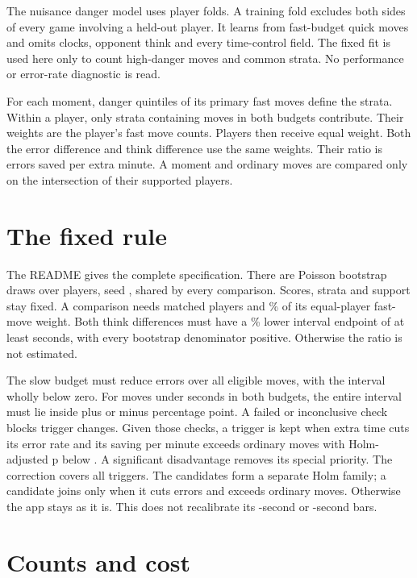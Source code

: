 \documentclass[11pt]{article}
\begin{document}
The nuisance danger model uses \FoldCount{} player folds. A training fold
excludes both sides of every game involving a held-out player. It learns
from fast-budget quick moves and omits clocks, opponent think and every
time-control field. The fixed fit is used here only to count high-danger
moves and common strata. No performance or error-rate diagnostic is read.

For each moment, danger quintiles of its primary fast moves define the
strata. Within a player, only strata containing moves in both budgets
contribute. Their weights are the player's fast move counts. Players then
receive equal weight. Both the error difference and think difference use
the same weights. Their ratio is errors saved per extra minute. A moment
and ordinary moves are compared only on the intersection of their
supported players.

\section{The fixed rule}
The README gives the complete specification. There are \Draws{} Poisson
bootstrap draws over players, seed \Seed, shared by every comparison.
Scores, strata and support stay fixed. A comparison needs \MinPlayers{}
matched players and \Coverage\% of its equal-player fast-move weight.
Both think differences must have a \Confidence\% lower interval endpoint
of at least \ThinkFloor{} seconds, with every bootstrap denominator positive.
Otherwise the ratio is not estimated.

The slow budget must reduce errors over all eligible moves, with the
interval wholly below zero. For moves under \PlaceboSeconds{} seconds in
both budgets, the entire interval must lie inside plus or minus
\PlaceboPoints{} percentage point. A failed or inconclusive check blocks
trigger changes. Given those checks, a trigger is kept when extra time
cuts its error rate and its saving per minute exceeds ordinary moves
with Holm-adjusted p below \Alpha. A significant disadvantage removes its
special priority. The correction covers all \TriggerCount{} triggers.
The \CandidateCount{} candidates form a separate Holm family; a candidate
joins only when it cuts errors and exceeds ordinary moves. Otherwise the
app stays as it is. This does not recalibrate its \DeepSeconds{}-second
or \BookSeconds{}-second bars.

\section{Counts and cost}
\begin{table}[h]
\centering\small\MomentTable
\caption{Primary eligible moves and players with moves in both budgets.
Candidates overlap. These are counts, not effect estimates.}
\end{table}
\end{document}
